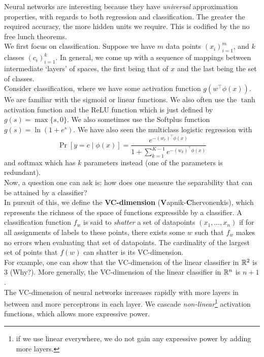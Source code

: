 \documentclass{article}
\begin{document}
		Neural networks are interesting because they have \emph{universal} approximation properties, with regards to both regression and classification. The greater the required accuracy, the more hidden units we require. This is codified by the no free lunch theorems.\\

		We first focus on classification. Suppose we have $m$ data points $(x_i)_{i=1}^m$, and $k$ classes $(c_i)_{i=1}^k$. In general, we come up with a sequence of mappings between intermediate `layers' of spaces, the first being that of $x$ and the last being the set of classes.\\
		Consider classification, where we have some activation function $g(w^\top\phi(x))$. We are familiar with the sigmoid or linear functions. We also often use the $\tanh$ activation function and the ReLU function which is just defined by $g(s) = \max\{s,0\}$. We also sometimes use the Softplus function $g(s) = \ln(1+e^s)$. We have also seen the multiclass logistic regression with
		\[ \Pr[y = c \mid \phi(x)] = \frac{e^{-(w_c)^\top\phi(x)}}{1 + \sum_{k=1}^{K-1} e^{-(w_k)^\top\phi(x)}} \]
		and softmax which has $k$ parameters instead (one of the parameters is redundant).\\

		Now, a question one can ask is: how does one measure the separability that can be attained by a classifier?\\
		In pursuit of this, we define the \textbf{VC-dimension} (\textbf{V}apnik-\textbf{C}hervonenkis), which represents the richness of the space of functions expressible by a classifier. A classification function $f_w$ is said to \emph{shatter} a set of datapoints $(x_1,\ldots,x_n)$ if for all assignments of labels to these points, there exists some $w$ such that $f_w$ makes no errors when evaluating that set of datapoints. The cardinality of the largest set of points that $f(w)$ can shatter is its VC-dimension.\\
		For example, one can show that the VC-dimension of the linear classifier in $\mathbb{R}^2$ is $3$ (Why?). More generally, the VC-dimension of the linear classifier in $\mathbb{R}^n$ is $n+1$.\\

		The VC-dimension of neural networks increases rapidly with more layers in between and more perceptrons in each layer. We cascade \emph{non-linear}\footnote{if we use linear everywhere, we do not gain any expressive power by adding more layers.} activation functions, which allows more expressive power.\\
\end{document}
